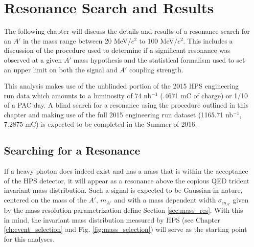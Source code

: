 
\chapter{Resonance Search and Results} \label{chap:resonance}

The following chapter will discuss the details and results of a resonance 
search for an $A'$ in the mass range between 20 MeV/$c^2$ to 100 MeV/$c^2$.
This includes a discussion of the procedure used to determine if a significant
resonance was observed at a given $A'$ mass hypothesis and the statistical
formalism used to set an upper limit on both the signal and $A'$ coupling
strength.

This analysis makes use of
the unblinded portion of the 2015 HPS engineering run data which amounts to 
a luminosity of 74 nb$^{-1}$ (.4671 mC of charge) or 1/10 of a PAC day.  
A blind search for a resonance using the procedure outlined in this chapter 
and making use of the full 2015 engineering run 
dataset (1165.71 nb$^{-1}$, 7.2875 mC) is expected to be completed in the 
Summer of 2016.

\section{Searching for a Resonance}

If a heavy photon does indeed exist and has a mass that is within the acceptance
of the HPS detector, it will appear as a resonance above the copious QED trident
invariant mass distribution.  Such a signal is expected to be Gaussian in nature, 
centered on the mass of the $A'$, $m_{A'}$ and with a mass dependent width 
$\sigma_{m_{A'}}$ given by the mass resolution parametrization define Section \ref{sec:mass_res}.
With this in mind, the invariant mass distribution measured by
HPS (see Chapter \ref{ch:event_selection} and Fig. \ref{fig:mass_selection}) 
will serve as the starting point for this analyses. 

